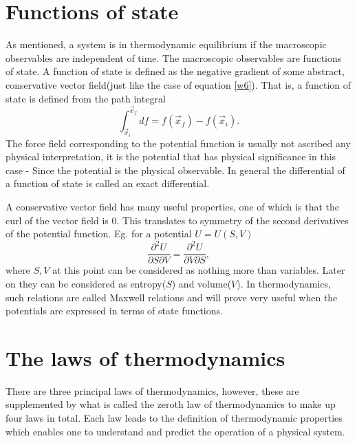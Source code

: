 \section{Functions of state}
As mentioned, a system is in thermodynamic equilibrium if the macroscopic observables are independent of time. The macroscopic observables are functions of state. A function of state is defined as the negative gradient of some abstract, conservative vector field(just like the case of equation \eqref{w6}). That is, a function of state is defined from the path integral
\begin{equation}
	\int_{\vec{x}_i}^{\vec{x}_f}df=f(\vec{x}_f)-f(\vec{x}_i).
	\label{f2}
\end{equation} 
The force field corresponding to the potential function is usually not ascribed any physical interpretation, it is the potential that has physical significance in this case - Since the potential is the physical observable. In general the differential of a function of state is called an exact differential. 
\begin{example}
	A conservative vector field has many useful properties, one of which is that the curl of the vector field is 0. This translates to symmetry of the second derivatives of the potential function. Eg. for a potential $U=U(S,V)$
	\begin{equation}
		\frac{\partial^2U}{\partial S\partial V}=\frac{\partial ^2U}{\partial V\partial S},
	\end{equation} 
	where $S,V$ at this point can be considered as nothing more than variables. Later on they can be considered as entropy($S$) and volume($V$). In thermodynamics, such relations are called Maxwell relations and will prove very useful when the potentials are expressed in terms of state functions.
\end{example}

\section{The laws of thermodynamics}
There are three principal laws of thermodynamics, however, these are supplemented by what is called the zeroth law of thermodynamics to make up four laws in total. Each law leads to the definition of thermodynamic properties which enables one to understand and predict the operation of a physical system.

